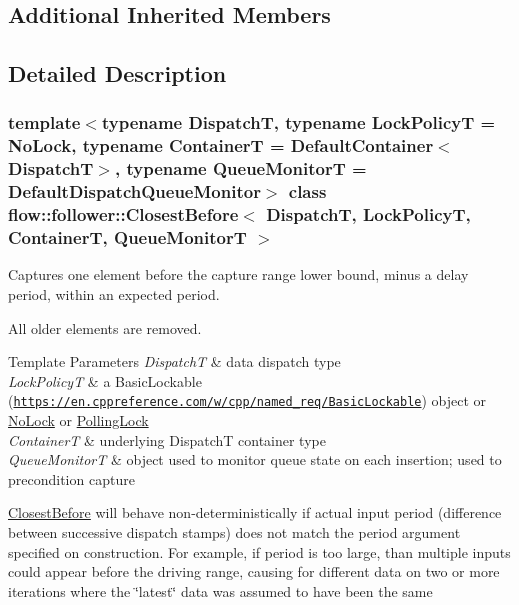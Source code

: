 \subsection*{Additional Inherited Members}


\subsection{Detailed Description}
\subsubsection*{template$<$typename DispatchT, typename Lock\+PolicyT = No\+Lock, typename ContainerT = Default\+Container$<$\+Dispatch\+T$>$, typename Queue\+MonitorT = Default\+Dispatch\+Queue\+Monitor$>$\newline
class flow\+::follower\+::\+Closest\+Before$<$ Dispatch\+T, Lock\+Policy\+T, Container\+T, Queue\+Monitor\+T $>$}

Captures one element before the capture range lower bound, minus a delay period, within an expected period. 

All older elements are removed.


\begin{DoxyTemplParams}{Template Parameters}
{\em DispatchT} & data dispatch type \\
\hline
{\em Lock\+PolicyT} & a Basic\+Lockable (\href{https://en.cppreference.com/w/cpp/named_req/BasicLockable}{\tt https\+://en.\+cppreference.\+com/w/cpp/named\+\_\+req/\+Basic\+Lockable}) object or \hyperlink{structflow_1_1_no_lock}{No\+Lock} or \hyperlink{structflow_1_1_polling_lock}{Polling\+Lock} \\
\hline
{\em ContainerT} & underlying {\ttfamily DispatchT} container type \\
\hline
{\em Queue\+MonitorT} & object used to monitor queue state on each insertion; used to precondition capture\\
\hline
\end{DoxyTemplParams}
\hyperlink{classflow_1_1follower_1_1_closest_before}{Closest\+Before} will behave non-\/deterministically if actual input period (difference between successive dispatch stamps) does not match the {\ttfamily period} argument specified on construction. For example, if {\ttfamily period} is too large, than multiple inputs could appear before the driving range, causing for different data on two or more iterations where the \char`\"{}latest\char`\"{} data was assumed to have been the same 

